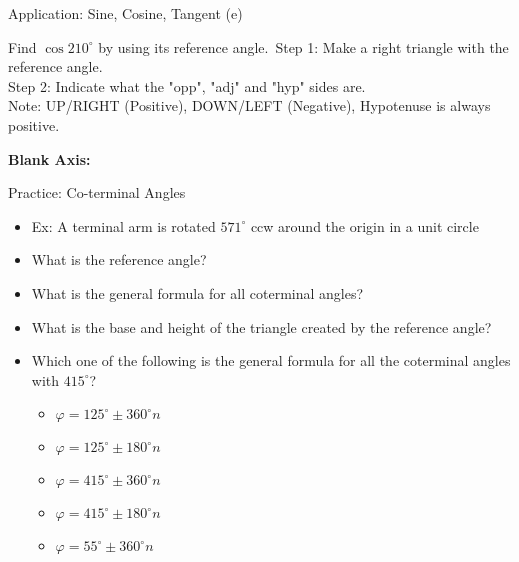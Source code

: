 \documentclass[aspectratio=169]{beamer}
\begin{document}
\begin{frame}{Application: Sine, Cosine, Tangent (e)}
\begin{tcolorbox}[colback=lightgray,colframe=primary,title=Application]
\footnotesize
Find $\cos 210^\circ$ by using its reference angle.\
Step 1: Make a right triangle with the reference angle.\\
Step 2: Indicate what the "opp", "adj" and "hyp" sides are.\\
Note: UP/RIGHT (Positive), DOWN/LEFT (Negative), Hypotenuse is always positive.

\vspace{1em}
\textbf{Blank Axis:}
\begin{center}
\end{center}
\end{tcolorbox}
\end{frame}

\begin{frame}{Practice: Co-terminal Angles}
    \begin{tcolorbox}[colback=lightgray,colframe=accent,title=Practice]
        \footnotesize
        \begin{itemize}
            \item Ex: A terminal arm is rotated $571^\circ$ ccw around the origin in a unit circle
            \item What is the reference angle?
            \item What is the general formula for all coterminal angles?
            \item What is the base and height of the triangle created by the reference angle?
        \end{itemize}
        \begin{itemize}
            \item Which one of the following is the general formula for all the coterminal angles with $415^\circ$?
            \begin{itemize}
                \item $\varphi = 125^\circ \pm 360^\circ n$
                \item $\varphi = 125^\circ \pm 180^\circ n$
                \item $\varphi = 415^\circ \pm 360^\circ n$
                \item $\varphi = 415^\circ \pm 180^\circ n$
                \item $\varphi = 55^\circ \pm 360^\circ n$
            \end{itemize}
        \end{itemize}
    \end{tcolorbox}
\end{frame}
\end{document}
